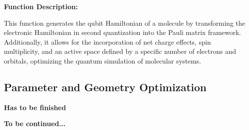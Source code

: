 \begin{enumerate}
    \textbf{Function Description:}
    
    This function generates the qubit Hamiltonian of a molecule by transforming the electronic Hamiltonian in second quantization into the Pauli matrix framework. Additionally, it allows for the incorporation of net charge effects, spin multiplicity, and an active space defined by a specific number of electrons and orbitals, optimizing the quantum simulation of molecular systems.
    
\end{enumerate}
\subsection{Parameter and Geometry Optimization}

\textbf{Has to be finished}

\textbf{To be continued...}
